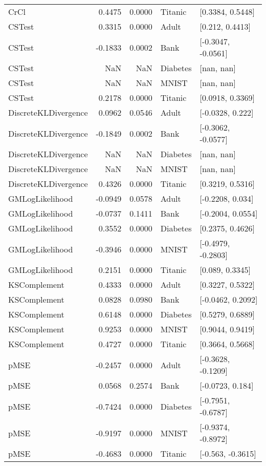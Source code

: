 \begin{tabular}{lrrll}
CrCl                  &       0.4475 &   0.0000 &   Titanic &    [0.3384, 0.5448] \\
CSTest                &       0.3315 &   0.0000 &     Adult &     [0.212, 0.4413] \\
CSTest                &      -0.1833 &   0.0002 &      Bank &  [-0.3047, -0.0561] \\
CSTest                &          NaN &      NaN &  Diabetes &          [nan, nan] \\
CSTest                &          NaN &      NaN &     MNIST &          [nan, nan] \\
CSTest                &       0.2178 &   0.0000 &   Titanic &    [0.0918, 0.3369] \\
DiscreteKLDivergence  &       0.0962 &   0.0546 &     Adult &    [-0.0328, 0.222] \\
DiscreteKLDivergence  &      -0.1849 &   0.0002 &      Bank &  [-0.3062, -0.0577] \\
DiscreteKLDivergence  &          NaN &      NaN &  Diabetes &          [nan, nan] \\
DiscreteKLDivergence  &          NaN &      NaN &     MNIST &          [nan, nan] \\
DiscreteKLDivergence  &       0.4326 &   0.0000 &   Titanic &    [0.3219, 0.5316] \\
GMLogLikelihood       &      -0.0949 &   0.0578 &     Adult &    [-0.2208, 0.034] \\
GMLogLikelihood       &      -0.0737 &   0.1411 &      Bank &   [-0.2004, 0.0554] \\
GMLogLikelihood       &       0.3552 &   0.0000 &  Diabetes &    [0.2375, 0.4626] \\
GMLogLikelihood       &      -0.3946 &   0.0000 &     MNIST &  [-0.4979, -0.2803] \\
GMLogLikelihood       &       0.2151 &   0.0000 &   Titanic &     [0.089, 0.3345] \\
KSComplement          &       0.4333 &   0.0000 &     Adult &    [0.3227, 0.5322] \\
KSComplement          &       0.0828 &   0.0980 &      Bank &   [-0.0462, 0.2092] \\
KSComplement          &       0.6148 &   0.0000 &  Diabetes &    [0.5279, 0.6889] \\
KSComplement          &       0.9253 &   0.0000 &     MNIST &    [0.9044, 0.9419] \\
KSComplement          &       0.4727 &   0.0000 &   Titanic &    [0.3664, 0.5668] \\
pMSE                  &      -0.2457 &   0.0000 &     Adult &  [-0.3628, -0.1209] \\
pMSE                  &       0.0568 &   0.2574 &      Bank &    [-0.0723, 0.184] \\
pMSE                  &      -0.7424 &   0.0000 &  Diabetes &  [-0.7951, -0.6787] \\
pMSE                  &      -0.9197 &   0.0000 &     MNIST &  [-0.9374, -0.8972] \\
pMSE                  &      -0.4683 &   0.0000 &   Titanic &   [-0.563, -0.3615] \\
\bottomrule
\end{tabular}
